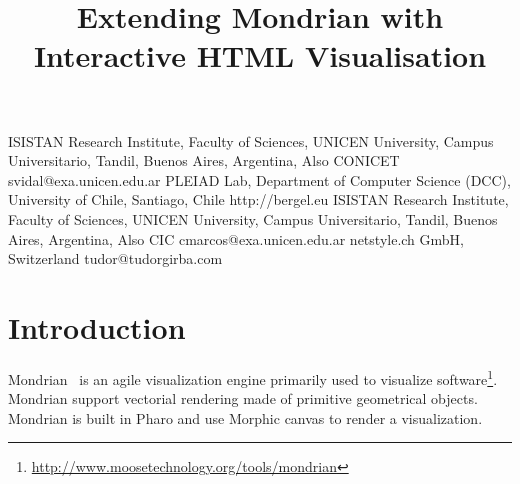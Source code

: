 \documentclass[preprint,10pt]{sigplanconf}
\newcommand{\TG}[1]{\nb{TG}{magenta}{#1}}
\newcommand{\ie}{\emph{i.e.,}\xspace}
\newcommand{\seclabel}[1]{\label{sec:#1}}
\begin{document}

\title{Extending Mondrian with Interactive HTML Visualisation}

	{ISISTAN Research Institute, Faculty of Sciences, UNICEN University, Campus Universitario, Tandil, Buenos Aires, Argentina, Also CONICET}
	{svidal@exa.unicen.edu.ar}
	{PLEIAD Lab, Department of Computer Science (DCC), University of Chile, Santiago, Chile}
	{http://bergel.eu}
	{ISISTAN Research Institute, Faculty of Sciences, UNICEN University, Campus Universitario, Tandil, Buenos Aires, Argentina, Also CIC}
	{cmarcos@exa.unicen.edu.ar}
	{netstyle.ch GmbH, Switzerland}
	{tudor@tudorgirba.com}


\maketitle



%

\section{Introduction}\seclabel{introduction}

Mondrian~\cite{Meye06a} is an agile visualization engine primarily used to visualize software\footnote{\url{http://www.moosetechnology.org/tools/mondrian}}. Mondrian support vectorial rendering made of primitive geometrical objects. Mondrian is built in Pharo and use Morphic canvas to render a visualization.
\end{document}
